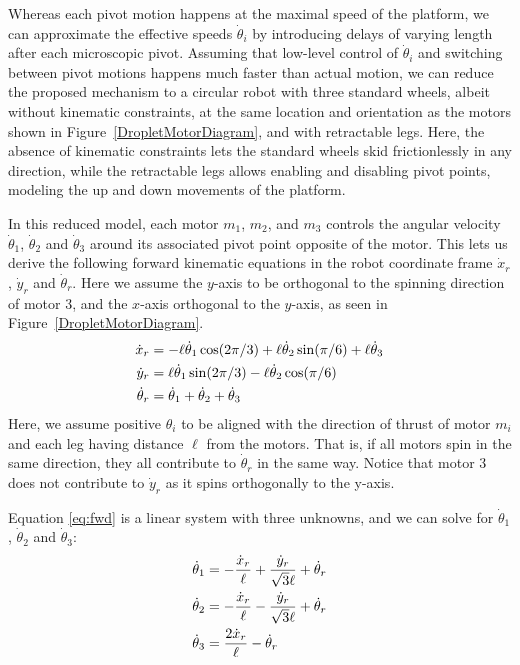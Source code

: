 \documentclass[letterpaper, 10pt, conference]{ieeeconf}
\begin{document}
Whereas each pivot motion happens at the maximal speed of the platform, we can approximate the effective speeds $\dot{\theta}_i$ by introducing delays of varying length after each microscopic pivot. Assuming that low-level control of $\dot{\theta}_i$ and switching between pivot motions happens much faster than actual motion, we can reduce the proposed mechanism to a circular robot with three standard wheels, albeit without kinematic constraints, at the same location and orientation as the motors shown in Figure~\ref{DropletMotorDiagram}, and with retractable legs. Here, the absence of kinematic constraints lets the standard wheels skid frictionlessly in any direction, while the retractable legs allows enabling and disabling pivot points, modeling the up and down movements of the platform. 

In this reduced model, each motor $m_1$, $m_2$, and $m_3$ controls the angular velocity $\dot{\theta}_1$, $\dot{\theta}_2$ and $\dot{\theta}_3$ around its associated pivot point opposite of the motor. This lets us derive the following forward kinematic equations in the robot coordinate frame $\dot{x}_r$, $\dot{y}_r$ and $\dot{\theta}_r$.
Here we assume the $y$-axis to be orthogonal to the spinning direction of motor 3, and the $x$-axis orthogonal to the $y$-axis, as seen in Figure~\ref{DropletMotorDiagram}.
\begin{align}\label{eq:fwd}
\dot{x}_r &= -\ell \dot{\theta}_1 \cos(2 \pi / 3) + \ell \dot{\theta}_2 \sin(\pi / 6) + \ell \dot{\theta}_3\notag\\
\dot{y}_r &=  \ell \dot{\theta}_1 \sin(2 \pi / 3) - \ell \dot{\theta}_2 \cos(\pi / 6)\\
\dot{\theta}_r &= \dot{\theta}_1 + \dot{\theta}_2 + \dot{\theta}_3\notag
\end{align}
Here, we assume positive $\theta_i$ to be aligned with the direction of thrust of motor $m_i$ and each leg having distance $\ell$ from the motors. That is, if all motors spin in the same direction, they all contribute to $\dot{\theta}_r$ in the same way. Notice that motor 3 does not contribute to $\dot{y}_r$ as it spins orthogonally to the y-axis.

Equation \ref{eq:fwd} is a linear system with three unknowns, and we can solve for $\dot{\theta}_1$, $\dot{\theta}_2$ and $\dot{\theta}_3$:
\begin{align}\label{eq:ik}
\dot{\theta}_1 & = -\frac{\dot{x}_r}{\ell} + \frac{\dot{y}_r}{\sqrt{3}\ell} + \dot{\theta}_r\notag\\
\dot{\theta}_2 & = -\frac{\dot{x}_r}{\ell} - \frac{\dot{y}_r}{\sqrt{3}\ell} + \dot{\theta}_r\\
\dot{\theta}_3 & = \frac{2 \dot{x}_r}{\ell} - \dot{\theta}_r\notag
\end{align}
\end{document}
